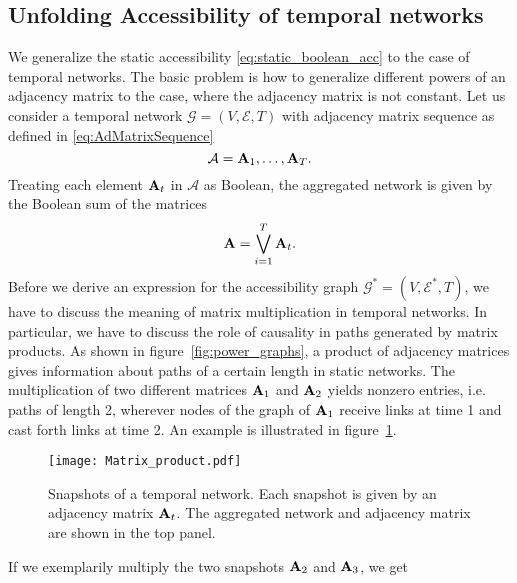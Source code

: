 \subsection{Unfolding Accessibility of temporal networks}\label{sec:unfolding_temporal}
We generalize the static accessibility \eqref{eq:static_boolean_acc} to the case of temporal networks.
The basic problem is how to generalize different powers of an adjacency matrix to the case, where the adjacency matrix is not constant.
Let us consider a temporal network $\mathcal{G}=(V,\mathcal{E},T)$ with adjacency matrix sequence as defined in \eqref{eq:AdMatrixSequence}
\begin{equation}\label{eq:AdMatrixSequence2}
\mathcal{A}=\mathbf{A}_1,\dots ,\mathbf{A}_T .
\end{equation}
Treating each element $\mathbf{A}_t$ in $\mathcal{A}$ as Boolean, the aggregated network is given by the Boolean sum of the matrices
\begin{equation}\label{eq:aggregation}
\mathbf{A}=\bigvee _{i=1} ^{T} \mathbf{A}_t .
\end{equation}
Before we derive an expression for the accessibility graph $\mathcal{G}^*=(V,\mathcal{E}^*,T)$, we have to discuss the meaning of matrix multiplication in temporal networks.
In particular, we have to discuss the role of causality in paths generated by matrix products.
As shown in figure~\ref{fig:power_graphs}, a product of adjacency matrices gives information about paths of a certain length in static networks.
The multiplication of two different matrices $\mathbf{A}_1$ and $\mathbf{A}_2$ yields nonzero entries, i.e. paths of length 2, wherever nodes of the graph of $\mathbf{A}_1$ receive links at time 1 and cast forth links at time 2.
An example is illustrated in figure~\ref{fig:matrix_product}.
%
\begin{figure}[htb]
\begin{center}
\texttt{[image: Matrix\_product.pdf]}
\caption{Snapshots of a temporal network.
Each snapshot is given by an adjacency matrix $\mathbf{A}_t$.
The aggregated network and adjacency matrix are shown in the top panel.}
\label{fig:matrix_product}
\end{center}
\end{figure}
%
If we exemplarily multiply the two snapshots $\mathbf{A}_2$ and $\mathbf{A}_3$, we get
